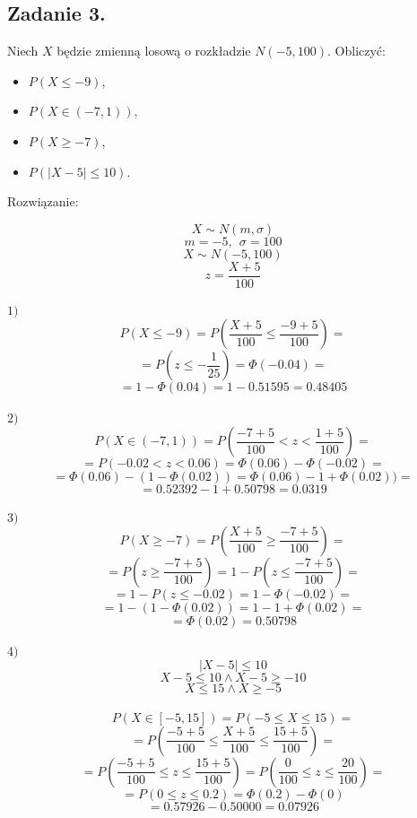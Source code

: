 \subsection{Zadanie 3.}
Niech $X$ będzie zmienną losową o rozkładzie $N ( - 5, 100)$. Obliczyć:
\begin{itemize}
\item $P (X \leq - 9)$, 
\item $P (X \in ( - 7, 1))$, 
\item $P (X \geq - 7)$, 
\item $P ( | X - 5 | \leq 10)$.
\end{itemize}


Rozwiązanie:

$$ X \sim N ( m, \sigma )$$
$$ m = -5, \ \ \sigma = 100 $$
$$ X \sim N ( -5, 100 )$$
$$ z = \frac{X + 5}{100} $$  \\

$1)$ 
$$ P( X \le -9 ) = P( \frac{X + 5}{100} \le \frac{-9 + 5}{100} ) = $$
$$ = P(z \le - \frac{1}{25}) = \Phi(-0.04) = $$
$$ = 1 -  \Phi(0.04) = 1 - 0.51595 = 0.48405$$ \\

$2)$
$$ P( X \in (-7, 1) ) = P( \frac{-7 + 5}{100} < z < \frac{1 + 5}{100} ) = $$
$$ = P( -0.02 < z <  0.06 ) = \Phi(0.06) - \Phi(-0.02) = $$
$$ = \Phi(0.06) - ( 1 -  \Phi(0.02) ) = \Phi(0.06) - 1 + \Phi(0.02)) = $$
$$ = 0.52392 - 1 + 0.50798 = 0.0319$$ \\

$3)$
$$ P( X \ge -7 ) = P( \frac{X+5}{100} \ge \frac{-7 + 5}{100} ) = $$
$$ = P( z \ge \frac{-7 + 5}{100} ) = 1 - P( z \le \frac{-7 + 5}{100} ) = $$
$$ = 1 - P( z \le -0.02 ) = 1 - \Phi(-0.02) = $$
$$ = 1 - ( 1 - \Phi(0.02) ) = 1 - 1 + \Phi(0.02) = $$
$$ = \Phi(0.02) = 0.50798$$ \\

$4)$
$$ | X - 5 | \le 10 $$
$$ X - 5 \le 10 \wedge X - 5 \ge -10 $$
$$ X \le 15 \wedge X \ge -5 $$ \\
$$ P( X \in [-5, 15] ) =  P( -5 \le X \le 15 ) = $$
$$ = P( \frac{-5 + 5}{100} \le \frac{X + 5}{100} \le \frac{15 + 5}{100} ) = $$
$$ = P( \frac{-5 + 5}{100} \le z \le \frac{15 + 5}{100} ) = P( \frac{0}{100} \le z \le \frac{20}{100} ) = $$
$$ = P( 0 \le z \le 0.2 ) = \Phi(0.2) - \Phi(0) $$
$$ = 0.57926 -0.50000 = 0.07926 $$
